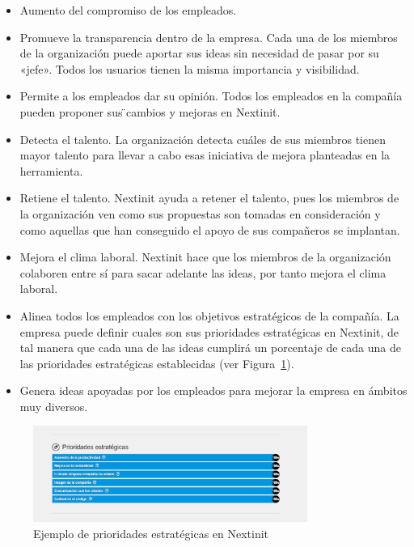  \begin{itemize}
 	\item Aumento del compromiso de los empleados. 
 	\item Promueve la transparencia dentro de la empresa. Cada una de los miembros de la organización
 	puede aportar sus ideas sin necesidad de pasar por 	su «jefe». Todos los usuarios tienen la misma
 	 importancia y visibilidad.
 	\item Permite a los empleados dar su opinión. Todos los empleados en la compañía pueden proponer sus  ̈cambios y mejoras en Nextinit.
 	\item Detecta el talento. La organización detecta cuáles de sus miembros tienen
 	mayor talento para llevar a cabo esas iniciativa de mejora planteadas en la herramienta.
 	\item Retiene el talento. Nextinit ayuda a retener el talento, pues los miembros de la organización
 	 ven como sus propuestas son tomadas en consideración y como aquellas que han conseguido el apoyo de
 	  sus compañeros se implantan.
 	\item Mejora el clima laboral. Nextinit hace que los miembros de la organización colaboren entre sí 
 	para sacar adelante las ideas, por tanto mejora el clima laboral.
 	\item Alinea todos los empleados con los objetivos estratégicos de la compañía. La empresa puede definir cuales son sus prioridades estratégicas en Nextinit, de tal manera que cada una de las ideas 
 	cumplirá un porcentaje de cada una de las prioridades estratégicas establecidas (ver Figura~\ref{fig:prioridades}).
 	\item Genera ideas apoyadas por los empleados para mejorar la empresa en ámbitos muy diversos.
 \end{itemize}

\begin{figure}[!h]
	\begin{center}
		\includegraphics[width=0.8\textwidth]{./img/introduccion/prioridades.png}
		\caption{Ejemplo de prioridades estratégicas en Nextinit}
		\label{fig:prioridades}
	\end{center}
\end{figure}
 
